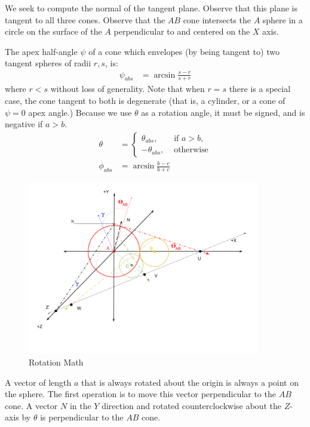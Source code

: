 \documentclass{article}
\begin{document}
We seek to compute the normal of the tangent plane.
Observe that this plane is tangent to all three cones.
Observe that the $AB$ cone intersects
the $A$ sphere in a circle on the surface of the $A$ perpendicular to and centered on the $X$ axis.

The apex half-angle $\psi$ of a cone which envelopes (by being tangent to) two tangent
spheres of radii $r,s$, is:
\begin{align}
 \psi_{abs} &= \arcsin{\frac{s - r}{s + r}}
\end{align}
where $r < s$ without loss of generality. Note that when $r = s$
there is a special case,
the cone tangent to both is degenerate (that is, a cylinder, or a cone of
$\psi = 0$ apex angle.)
Because we use $\theta$ as a rotation angle, it must be signed, and is
negative if $a > b$.
\begin{align}
  \theta &= \begin{cases}
    \theta_{abs}, & \text{ if $a > b$, } \\
    -\theta_{abs}, & \text{  otherwise}
\end{cases} \label{eq:theta} \\
  \phi_{abs} &= \arcsin{\frac{b - c}{b + c}}
\end{align}


\begin{figure}
     \centering
     \includegraphics[width=0.9\textwidth]{figures/RotationMath.png}
     \caption{Rotation Math}
  \label{fig:rotation}
\end{figure}

A vector of length $a$ that is always rotated about the origin is always a point on the sphere.
The first operation is to move this vector perpendicular to the $AB$ cone.
A vector $N$ in the $Y$ direction and rotated counterclockwise
about the $Z$-axis by $\theta$ is perpendicular to the $AB$ cone.
\end{document}
